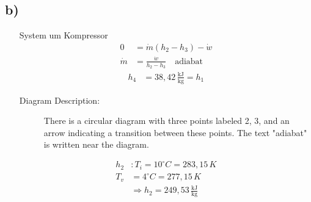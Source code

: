 

\subsection*{b)}

\begin{itemize}
    \item[System um Kompressor]
    \begin{align*}
        0 &= \dot{m} (h_2 - h_3) - \dot{w} \\
        \dot{m} &= \frac{\dot{w}}{h_2 - h_3} \quad \text{adiabat}
    \end{align*}
    \begin{align*}
        h_4 &= 38,42 \, \frac{\text{kJ}}{\text{kg}} = h_1
    \end{align*}
    \begin{description}
        \item[Diagram Description:] There is a circular diagram with three points labeled 2, 3, and an arrow indicating a transition between these points. The text "adiabat" is written near the diagram.
    \end{description}
    \begin{align*}
        h_2 &: T_i = 10^\circ C = 283,15 \, K \\
        T_v &= 4^\circ C = 277,15 \, K \\
        &\Rightarrow h_2 = 249,53 \, \frac{\text{kJ}}{\text{kg}}
    \end{align*}
\end{itemize}